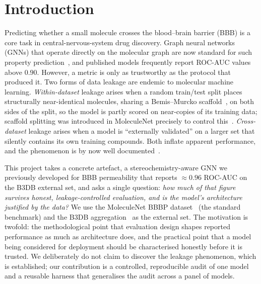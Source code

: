 \documentclass[conference]{IEEEtran}
\begin{document}
\section{Introduction}
Predicting whether a small molecule crosses the blood--brain barrier (BBB) is a
core task in central-nervous-system drug discovery. Graph neural networks (GNNs)
that operate directly on the molecular graph are now standard for such property
prediction~\cite{wu2018,yang2019}, and published models frequently report
ROC-AUC values above $0.90$. However, a metric is only as trustworthy as the
protocol that produced it. Two forms of data leakage are endemic to molecular
machine learning. \emph{Within-dataset} leakage arises when a random train/test
split places structurally near-identical molecules, sharing a Bemis--Murcko
scaffold~\cite{bemis1996}, on both sides of the split, so the model is partly
scored on near-copies of its training data; scaffold splitting was introduced in
MoleculeNet precisely to control this~\cite{wu2018}. \emph{Cross-dataset} leakage
arises when a model is ``externally validated'' on a larger set that silently
contains its own training compounds. Both inflate apparent performance, and the
phenomenon is by now well documented~\cite{tilden2024,kapoor2023}.

This project takes a concrete artefact, a stereochemistry-aware GNN we previously
developed for BBB permeability that reports $\approx 0.96$ ROC-AUC on the B3DB
external set, and asks a single question: \emph{how much of that figure survives
honest, leakage-controlled evaluation, and is the model's architecture justified
by the data?} We use the MoleculeNet BBBP dataset~\cite{wu2018} (the standard
benchmark) and the B3DB aggregation~\cite{meng2021} as the external set. The
motivation is twofold: the methodological point that evaluation design shapes
reported performance as much as architecture does, and the practical point that a
model being considered for deployment should be characterised honestly before it
is trusted. We deliberately do not claim to discover the leakage phenomenon, which
is established; our contribution is a controlled, reproducible audit of one model
and a reusable harness that generalises the audit across a panel of models.
\end{document}
